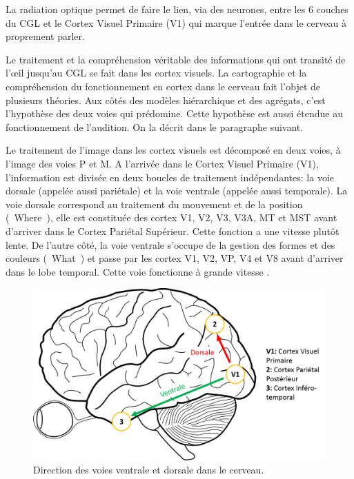 	\par La radiation optique permet de faire le lien, via des neurones, entre les 6 couches du CGL et le Cortex Visuel Primaire (V1) qui marque l'entrée dans le cerveau à proprement parler.
	
	\par Le traitement et la compréhension véritable des informations qui ont transité de l'œil jusqu'au CGL se fait dans les cortex visuels. La cartographie et la compréhension du fonctionnement en cortex dans le cerveau fait l'objet de plusieurs théories. Aux côtés des modèles hiérarchique et des agrégats, c'est l'hypothèse des deux voies \citep{ingle_two_1982, mishkin_object_1983, goodale_neurological_1991} qui prédomine. Cette hypothèse est aussi étendue au fonctionnement de l'audition. On la décrit dans le paragraphe suivant.
	
	\par Le traitement de l'image dans les cortex visuels est décomposé en deux voies, à l'image des voies P et M. A l'arrivée dans le Cortex Visuel Primaire (V1), l'information est divisée en deux boucles de traitement indépendantes: la voie dorsale (appelée aussi pariétale) et la voie ventrale (appelée aussi temporale). La voie dorsale correspond au traitement du mouvement et de la position (\guillemotleft~Where~\guillemotright), elle est constituée des cortex V1, V2, V3, V3A, MT et MST avant d'arriver dans le Cortex Pariétal Supérieur. Cette fonction a une vitesse plutôt lente. De l'autre côté, la voie ventrale s'occupe de la gestion des formes et des couleurs (\guillemotleft~What~\guillemotright) et passe par les cortex V1, V2, VP, V4 et V8 avant d'arriver dans le lobe temporal. Cette voie fonctionne à grande vitesse \citep{dhondt_emotion_2011, kaiser_dorsal_2010}.
	
	\begin{figure}
		\centering
		\includegraphics[scale=.35]{Figures/VoiesVentraleDorsale}
		\caption{Direction des voies ventrale et dorsale dans le cerveau.}
		\label{fig:voies_ventrale_dorsale}
	\end{figure}
	
